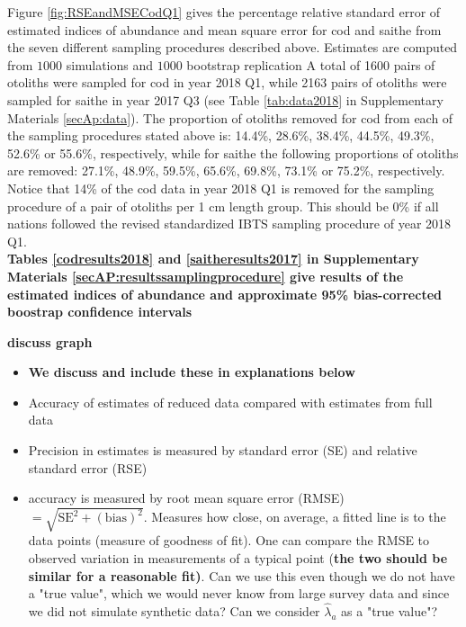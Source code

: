 \documentclass[a4paper 12pt]{article}
\numberwithin{equation}{section}
\begin{document}
Figure \ref{fig:RSEandMSECodQ1} gives the percentage relative standard error of estimated indices of abundance and mean square error for cod and saithe from the seven different sampling procedures described above. Estimates are computed from $1000$ simulations and $1000$ bootstrap replication A total of 1600 pairs of otoliths were sampled for cod in year 2018 Q1, while 2163 pairs of otoliths were sampled for saithe in year 2017 Q3 (see Table \ref{tab:data2018} in Supplementary Materials \ref{secAp:data}). The proportion of otoliths removed for cod from each of the sampling  procedures stated above is: 14.4\%, 28.6\%, 38.4\%, 44.5\%, 49.3\%, 52.6\% or 55.6\%, respectively, while for saithe the following proportions of otoliths are removed: 27.1\%, 48.9\%, 59.5\%, 65.6\%, 69.8\%, 73.1\% or 75.2\%, respectively. Notice that 14\% of the cod data in year 2018 Q1 is removed for the sampling procedure of a pair of otoliths per 1 cm length group. This should be 0\% if all nations followed the revised standardized IBTS sampling procedure of year 2018 Q1. \\

{\bf Tables \ref{codresults2018} and \ref{saitheresults2017} in Supplementary Materials \ref{secAP:resultssamplingprocedure}  give results of the estimated indices of abundance and approximate 95\% bias-corrected boostrap confidence intervals }

{\bf discuss graph}\\

\begin{itemize}
\item {\bf We discuss and include these in explanations below}
\item Accuracy of estimates of reduced data compared with estimates from full data
\item Precision in estimates is measured by standard error (SE) and relative standard error (RSE)
\item accuracy is measured by root mean square error (RMSE) $= \sqrt{\mathrm{SE}^2 + (\mathrm{bias})^2}$. Measures how close, on average, a fitted line is to the data points (measure of goodness of fit). One can compare the RMSE to observed variation in measurements of a typical point {(\bf the two should be similar for a reasonable fit)}. Can we use this even though we do not have a "true value", which we would never know from large survey data and since we did not simulate synthetic data? Can we consider $\hat{\lambda}_{a}$ as a "true value"?
\end{itemize}
\end{document}
